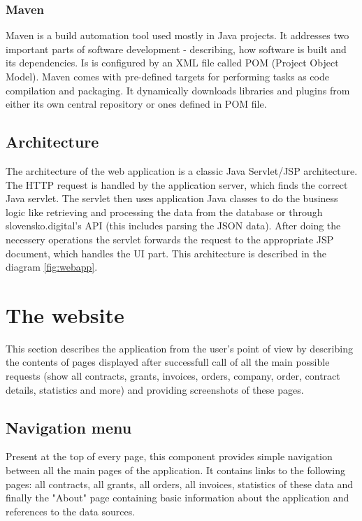\documentclass[thesis=B,english]{FITthesis}[2012/06/26]
\begin{document}
	\subsubsection{Maven}
	Maven is a build automation tool used mostly in Java projects. It addresses two important parts of software development - describing, how software is built and its dependencies. Is is configured by an XML file called POM (Project Object Model). Maven comes with pre-defined targets for performing tasks as code compilation and packaging. It dynamically downloads libraries and plugins from either its own central repository or ones defined in POM file.
	
	\subsection{Architecture}
	The architecture of the web application is a classic Java Servlet/JSP architecture. The HTTP request is handled by the application server, which finds the correct Java servlet. The servlet then uses application Java classes to do the business logic like retrieving and processing the data from the database or through slovensko.digital's API (this includes parsing the JSON data). After doing the necessery operations the servlet forwards the request to the appropriate JSP document, which handles the UI part. This architecture is described in the diagram \ref{fig:webapp}.


	\section{The website}
	This section describes the application from the user's point of view by describing the contents of pages displayed after successfull call of all the main possible requests (show all contracts, grants, invoices, orders, company, order, contract details, statistics and more) and providing screenshots of these pages.
	
	\subsection{Navigation menu}
	Present at the top of every page, this component provides simple navigation between all the main pages of the application. It contains links to the following pages: all contracts, all grants, all orders, all invoices, statistics of these data and finally the "About" page containing basic information about the application and references to the data sources.
\end{document}
